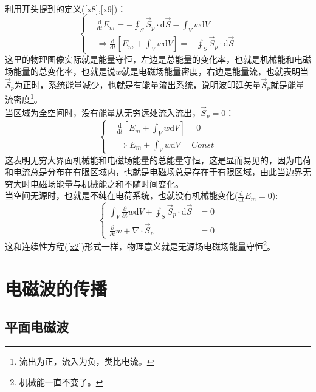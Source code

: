 \documentclass[12pt]{article}
\begin{document}
利用开头提到的定义(\ref{x8},\ref{x9})：
\begin{equation}
    \left\{\begin{split}
        &\frac{\mathrm{d}}{\mathrm{d}t}E_m=-\oint_S \Vec{S}_p\cdot\mathrm{d}\Vec{S}-\int_V w\mathrm{d}V\\
        &\Rightarrow \frac{\mathrm{d}}{\mathrm{d}t}[E_m+\int_V w\mathrm{d}V]=-\oint_S \Vec{S}_p\cdot\mathrm{d}\Vec{S}
    \end{split}\right.
\end{equation}
这里的物理图像实际就是能量守恒，左边是总能量的变化率，也就是机械能和电磁场能量的总变化率，也就是说$w$就是电磁场能量密度，右边是能量流，也就表明当$\Vec{S}_p$为正时，系统能量减少，也就是有能量流出系统，说明波印廷矢量$\Vec{S}_p$就是能量流密度\footnote{流出为正，流入为负，类比电流。}。\\
当区域为全空间时，没有能量从无穷远处流入流出，$\Vec{S}_p=0$：
\begin{equation}
    \left\{\begin{split}
       &\frac{\mathrm{d}}{\mathrm{d}t}[E_m+\int_V w\mathrm{d}V]=0\\
       &\Rightarrow E_m+\int_V w\mathrm{d}V=Const
    \end{split}\right.
\end{equation}
这表明无穷大界面机械能和电磁场能量的总能量守恒，这是显而易见的，因为电荷和电流总是分布在有限区域内，也就是电磁场总是存在于有限区域，由此当边界无穷大时电磁场能量与机械能之和不随时间变化。\\
当空间无源时，也就是不纯在电荷系统，也就没有机械能变化($\frac{\mathrm{d}}{\mathrm{d}t}E_m=0$):
\begin{equation}
\left\{\begin{split}
    \int_V \frac{\partial}{\partial t} w\mathrm{d}V+\oint_S \Vec{S}_p\cdot\mathrm{d}\Vec{S}&=0\\
    \frac{\partial}{\partial t}w+\nabla\cdot\Vec{S}_p&=0
\end{split}\right.
\end{equation}
这和连续性方程(\ref{x2})形式一样，物理意义就是无源场电磁场能量守恒\footnote{机械能一直不变了。}。

\section{电磁波的传播}
\subsection{平面电磁波}
\end{document}
